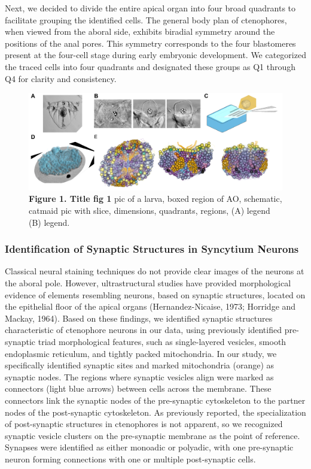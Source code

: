\documentclass[
  11pt,
]{article}
\begin{document}
Next, we decided to divide the entire apical organ into four broad
quadrants to facilitate grouping the identified cells. The general body
plan of ctenophores, when viewed from the aboral side, exhibits biradial
symmetry around the positions of the anal pores. This symmetry
corresponds to the four blastomeres present at the four-cell stage
during early embryonic development. We categorized the traced cells into
four quadrants and designated these groups as Q1 through Q4 for clarity
and consistency.

\begin{figure}[H]

{\centering \includegraphics[width=1\textwidth,height=\textheight]{figures/Figure1.png}

}

\caption{\textbf{Figure 1. Title fig 1} pic of a larva, boxed region of
AO, schematic, catmaid pic with slice, dimensions, quadrants, regions,
(A) legend (B) legend.}

\end{figure}%

\subsubsection{Identification of Synaptic Structures in Syncytium
Neurons}\label{identification-of-synaptic-structures-in-syncytium-neurons}

Classical neural staining techniques do not provide clear images of the
neurons at the aboral pole. However, ultrastructural studies have
provided morphological evidence of elements resembling neurons, based on
synaptic structures, located on the epithelial floor of the apical
organs (Hernandez-Nicaise, 1973; Horridge and Mackay, 1964). Based on
these findings, we identified synaptic structures characteristic of
ctenophore neurons in our data, using previously identified pre-synaptic
triad morphological features, such as single-layered vesicles, smooth
endoplasmic reticulum, and tightly packed mitochondria. In our study, we
specifically identified synaptic sites and marked mitochondria (orange)
as synaptic nodes. The regions where synaptic vesicles align were marked
as connectors (light blue arrows) between cells across the membrane.
These connectors link the synaptic nodes of the pre-synaptic
cytoskeleton to the partner nodes of the post-synaptic cytoskeleton. As
previously reported, the specialization of post-synaptic structures in
ctenophores is not apparent, so we recognized synaptic vesicle clusters
on the pre-synaptic membrane as the point of reference. Synapses were
identified as either monoadic or polyadic, with one pre-synaptic neuron
forming connections with one or multiple post-synaptic cells.
\end{document}
